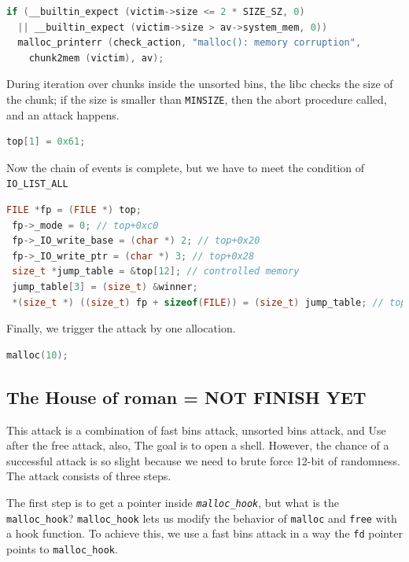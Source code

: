 \documentclass{masterthesis}
\newcommand*\fb{fast bins}
\newcommand*\ub{unsorted bins}
\newcommand*\mallocc{\lstinline{malloc}}
\begin{document}
\begin{lstlisting}[language=c,frame=tlrb]
if (__builtin_expect (victim->size <= 2 * SIZE_SZ, 0)
  || __builtin_expect (victim->size > av->system_mem, 0))
  malloc_printerr (check_action, "malloc(): memory corruption",
    chunk2mem (victim), av);
\end{lstlisting}


During iteration over chunks inside the \ub{}, the libc checks the size of the chunk; if the size is smaller than \lstinline{MINSIZE}, then the abort procedure called, and an attack happens.

\begin{lstlisting}[language=c,frame=tlrb]
top[1] = 0x61;
\end{lstlisting}


Now the chain of events is complete, but we have to meet the condition of \lstinline{IO_LIST_ALL}

\begin{lstlisting}[language=c,frame=tlrb]
 FILE *fp = (FILE *) top;
 fp->_mode = 0; // top+0xc0
 fp->_IO_write_base = (char *) 2; // top+0x20
 fp->_IO_write_ptr = (char *) 3; // top+0x28
 size_t *jump_table = &top[12]; // controlled memory
 jump_table[3] = (size_t) &winner;
 *(size_t *) ((size_t) fp + sizeof(FILE)) = (size_t) jump_table; // top+0xd8
\end{lstlisting}

Finally, we trigger the attack by one allocation.

\begin{lstlisting}[language=c,frame=tlrb]
 malloc(10);
\end{lstlisting}

\subsection{The House of roman = NOT FINISH YET}
This attack is a combination of \fb{} attack, \ub{} attack, and Use after the free attack, also, The goal is to open a shell. However, the chance of a successful attack is so slight because we need to brute force 12-bit of randomness. The attack consists of three steps.

The first step is to get a pointer inside \emph{\lstinline{malloc_hook}}, but what is the \lstinline{malloc_hook}? \lstinline{malloc_hook} lets us modify the behavior of \mallocc{} and \lstinline{free} with a hook function. To achieve this, we use a \fb{} attack in a way the \lstinline{fd} pointer points to \lstinline{malloc_hook}.
\end{document}
